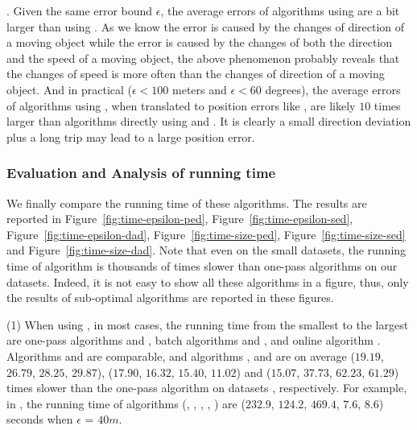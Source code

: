 .
Given the same error bound $\epsilon$, the average errors of algorithms using \sed are a bit larger than using \ped. {As we know the \ped error is caused by the changes of direction of a moving object while the \sed error is caused by the changes of both the direction and the speed of a moving object, the above phenomenon probably reveals that the changes of speed is more often than the changes of direction of a moving object.}
%
And in practical (\eg $\epsilon <100$ meters and $\epsilon < 60$ degrees), the average errors of algorithms using \dad, when translated to position errors like \ped, are likely $10$ times larger than algorithms directly using \ped and \sed. It is clearly a small direction deviation plus a long trip may lead to a large position error.





\vspace{-1ex}
\subsubsection{Evaluation and Analysis of running time}

We finally compare the running time of these algorithms.
The results are reported in Figure~\ref{fig:time-epsilon-ped}, Figure~\ref{fig:time-epsilon-sed}, Figure~\ref{fig:time-epsilon-dad}, Figure~\ref{fig:time-size-ped}, Figure~\ref{fig:time-size-sed} and Figure~\ref{fig:time-size-dad}.
Note that even on the small datasets, the running time of algorithm \opt is thousands of times slower than one-pass algorithms on our datasets. Indeed, it is not easy to show all these algorithms in a figure, thus, only the results of sub-optimal algorithms are reported in these figures.

\sstab (1) When using \ped, in most cases, the running time from the smallest to the largest are one-pass algorithms \siped and \operb, batch algorithms \tpa and \dpa, and online algorithm \bqsa.
Algorithms \siped and \operb are comparable, and algorithms \tpa, \dpa and \bqsa are on average
($19.19$, $26.79$, $28.25$, $29.87$), ($17.90$, $16.32$, $15.40$, $11.02$) and ($15.07$, $37.73$, $62.23$, $61.29$)
times slower than the one-pass algorithm \siped on datasets \dSets, respectively.
%
For example, in \mopsi, the running time of algorithms
(\tpa, \dpa, \bqsa, \siped, \operb ) are ($232.9$, $124.2$, $469.4$, $7.6$, $8.6$) seconds when $\epsilon$ = $40m$.

